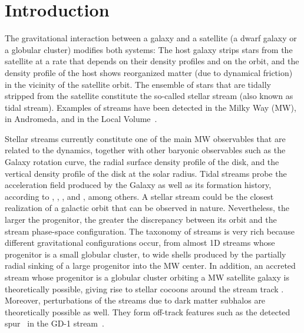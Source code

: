 \documentclass[twocolumn]{aa}
\begin{document}
   \maketitle

\section{Introduction}
The gravitational interaction between a galaxy and a satellite (a dwarf galaxy or a globular cluster) modifies both systems: The host galaxy strips stars from the satellite at a rate
that depends on their density profiles and on the orbit,
and the density profile of the host shows reorganized matter (due to dynamical friction) in the vicinity of the satellite orbit.
The ensemble of stars that are tidally stripped from the satellite constitute the so-called stellar stream (also known as tidal stream). Examples of streams have been detected in the Milky Way (MW), in Andromeda, and in the Local Volume~\citep{Martinez-Delgado_2010}.

Stellar streams currently constitute one of the main MW observables that are related to the dynamics, together with other baryonic observables such as the Galaxy rotation curve, the radial surface density profile of the disk, and the vertical density profile of the disk at the solar radius.
Tidal streams probe the acceleration field produced by the Galaxy \citep{1999ApJ...512L.109J,1999A&A...348L..49Z,2009ApJ...703L..67L,2013MNRAS.436.2386L,2016ASSL..420..169J,Ibata_2016,2017ApJ...842..120I,2017A&A...603A..65T,2021MNRAS.502.4170R} as well as its formation history, according to \citet{1999Natur.402...53H}, \citet{2020ARA&A..58..205H}, \citet{2022A&A...666A..64R}, and \citet{2023arXiv230708730C}, among others.
A stellar stream could be the closest realization of a galactic orbit that can be observed in nature.
Nevertheless, the larger the progenitor, the greater the discrepancy between its orbit and the stream phase-space configuration. The taxonomy of streams is very rich \citep{2015MNRAS.450..575A} because different gravitational configurations occur, from almost 1D streams whose progenitor is a small globular cluster, to wide shells produced by the partially radial sinking of a large progenitor into the MW center. In addition, an accreted stream whose progenitor is a globular cluster orbiting a MW satellite galaxy is theoretically possible, giving rise to stellar cocoons around the
stream track \citep{2018ApJ...861...69C,2019ApJ...881..106M,2021MNRAS.501..179M,2021ApJ...911L..32G,2022MNRAS.511.2339Q}.
Moreover, perturbations of the streams due to dark matter subhalos are theoretically possible as well. They form off-track features such as the detected spur~\citep{Price-Whelan_2018} in
the GD-1 stream~\citep{Grillmair_2006}.
\end{document}
